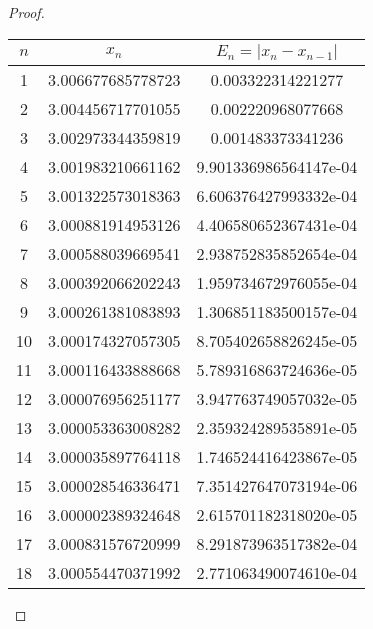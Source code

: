 \begin{enumerate}
\begin{proof}
\begin{table}[H]
\begin{subtable}[t]{.8\textwidth}
\begin{table}[H]
\begin{subtable}[t]{.8\textwidth}
\begin{table}[htbp]
\begin{subtable}[t]{.49\linewidth}
			\begin{tabular}{|c|c|c|}
			\hline
			$n$	&	\(x_n\)				&	\(E_n=|x_n-x_{n-1}|\)	\\	\hline
			\footnotesize	1	&	\footnotesize	3.006677685778723	&	\footnotesize	0.003322314221277	\\	\hline
			\footnotesize	2	&	\footnotesize	3.004456717701055	&	\footnotesize	0.002220968077668	\\	\hline
			\footnotesize	3	&	\footnotesize	3.002973344359819	&	\footnotesize	0.001483373341236	\\	\hline
			\footnotesize	4	&	\footnotesize	3.001983210661162	&	\footnotesize	9.901336986564147e-04	\\	\hline
			\footnotesize	5	&	\footnotesize	3.001322573018363	&	\footnotesize	6.606376427993332e-04	\\	\hline
			\footnotesize	6	&	\footnotesize	3.000881914953126	&	\footnotesize	4.406580652367431e-04	\\	\hline
			\footnotesize	7	&	\footnotesize	3.000588039669541	&	\footnotesize	2.938752835852654e-04	\\	\hline
			\footnotesize	8	&	\footnotesize	3.000392066202243	&	\footnotesize	1.959734672976055e-04	\\	\hline
			\footnotesize	9	&	\footnotesize	3.000261381083893	&	\footnotesize	1.306851183500157e-04	\\	\hline
			\footnotesize	10	&	\footnotesize	3.000174327057305	&	\footnotesize	8.705402658826245e-05	\\	\hline
			\footnotesize	11	&	\footnotesize	3.000116433888668	&	\footnotesize	5.789316863724636e-05	\\	\hline
			\footnotesize	12	&	\footnotesize	3.000076956251177	&	\footnotesize	3.947763749057032e-05	\\	\hline
			\footnotesize	13	&	\footnotesize	3.000053363008282	&	\footnotesize	2.359324289535891e-05	\\	\hline
			\footnotesize	14	&	\footnotesize	3.000035897764118	&	\footnotesize	1.746524416423867e-05	\\	\hline
			\footnotesize	15	&	\footnotesize	3.000028546336471	&	\footnotesize	7.351427647073194e-06	\\	\hline
			\footnotesize	16	&	\footnotesize	3.000002389324648	&	\footnotesize	2.615701182318020e-05	\\	\hline
			\footnotesize	17	&	\footnotesize	3.000831576720999	&	\footnotesize	8.291873963517382e-04	\\	\hline
			\footnotesize	18	&	\footnotesize	3.000554470371992	&	\footnotesize	2.771063490074610e-04	\\	\hline

\end{tabular}
\end{subtable}
\end{table}
\end{subtable}
\end{table}
\end{subtable}
\end{table}
\end{proof}
\end{enumerate}
